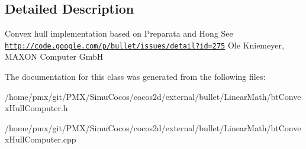 \subsection{Detailed Description}
Convex hull implementation based on Preparata and Hong See \href{http://code.google.com/p/bullet/issues/detail?id=275}{\tt http\+://code.\+google.\+com/p/bullet/issues/detail?id=275} Ole Kniemeyer, M\+A\+X\+ON Computer GmbH 

The documentation for this class was generated from the following files\+:\begin{DoxyCompactItemize}
\item 
/home/pmx/git/\+P\+M\+X/\+Simu\+Cocos/cocos2d/external/bullet/\+Linear\+Math/bt\+Convex\+Hull\+Computer.\+h\item 
/home/pmx/git/\+P\+M\+X/\+Simu\+Cocos/cocos2d/external/bullet/\+Linear\+Math/bt\+Convex\+Hull\+Computer.\+cpp\end{DoxyCompactItemize}
